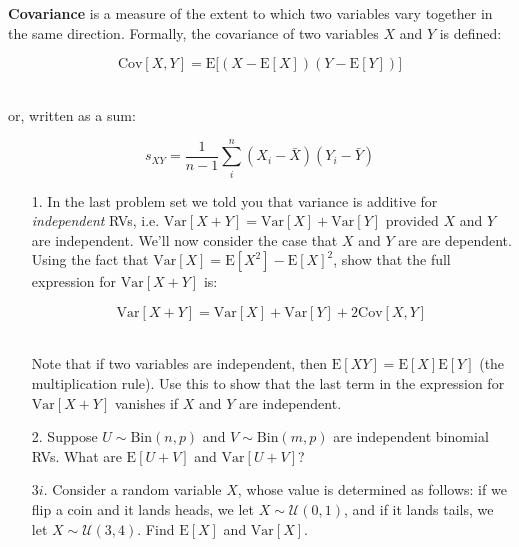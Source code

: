 \documentclass[10pt]{extarticle}
\newcommand{\E}{\text{E}}
\newcommand{\Var}{\text{Var}}
\newcommand{\Cov}{\text{Cov}}
\begin{document}
{\bf Covariance} is a measure of the extent to which two variables vary together in the same direction. Formally, the covariance of two variables $X$ and $Y$ is defined:

$$\Cov[X,Y] = \E \big[ (X - \E[X]) (Y - \E[Y] )\big]$$ \ 

or, written as a sum:

$$s_{XY} = \frac{1}{n-1} \sum_i^n (X_i - \bar X)(Y_i - \bar Y)$$ 

\hfill 

\begin{itemize}

	\item[1.] In the last problem set we told you that variance is additive for {\it independent} RVs, i.e. $\Var[X+Y] = \Var[X] + \Var[Y]$ provided $X$ and $Y$ are independent. We'll now consider the case that $X$ and $Y$ are are dependent. \\ 

Using the fact that $\Var[X] = \E[X^2] - \E[X]^2$, show that the full expression for $\Var[X+Y]$ is:

$$\Var[X+Y] = \Var[X] + \Var[Y] + 2\Cov[X,Y]$$ \ 

Note that if two variables are independent, then $\E[XY] = \E[X] \E[Y]$ (the multiplication rule). Use this to show that the last term in the expression for $\Var[X+Y]$ vanishes if $X$ and $Y$ are independent. \\  

	\item[2.] Suppose $U \sim \text{Bin}(n,p)$ and $V \sim \text{Bin}(m,p)$ are independent binomial RVs. What are $\E[U+V]$ and $\Var[U+V]$? \\ 

	\item[3$i$.] Consider a random variable $X$, whose value is determined as follows: if we flip a coin and it lands heads, we let $X \sim \mathcal U(0,1)$, and if it lands tails, we let $X \sim \mathcal U(3,4)$. Find $\E[X]$ and $\Var[X]$.   

\end{itemize} 
\end{document}
